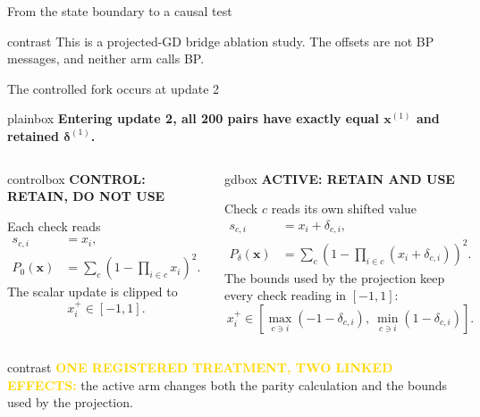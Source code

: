 \documentclass[aspectratio=169,9pt,t]{beamer}
\begin{document}
\begin{frame}{From the state boundary to a causal test}
\vfill
\begin{beamercolorbox}[rounded=true,sep=.55ex]{contrast}
  \centering\fontsize{7}{7.8}\selectfont
  This is a projected-GD bridge ablation study.  The offsets are not BP messages, and neither arm calls BP.
\end{beamercolorbox}
\end{frame}

\begin{frame}{The controlled fork occurs at update 2}
\begin{beamercolorbox}[rounded=true,sep=.62ex]{plainbox}
  \centering\fontsize{7.4}{8.2}\selectfont
  \textbf{Entering update 2, all 200 pairs have exactly equal $\mathbf x^{(1)}$ and retained $\boldsymbol\delta^{(1)}$.}
\end{beamercolorbox}
\vspace{.8mm}

\begin{columns}[T,onlytextwidth]
  \begin{beamercolorbox}[rounded=true,sep=.7ex]{controlbox}
    \fontsize{7.5}{8.3}\selectfont\textcolor{Control}{\bfseries CONTROL: RETAIN, DO NOT USE}\par
    \vspace{1mm}
    Each check reads
    \[
      \begin{aligned}
        s_{c,i}&=x_i,\\
        P_0(\mathbf x)&=\sum_c\left(1-\prod_{i\in c}x_i\right)^2 .
      \end{aligned}
    \]
    The scalar update is clipped to
    \[
      x_i^+\in[-1,1].
    \]
  \end{beamercolorbox}

  \begin{beamercolorbox}[rounded=true,sep=.7ex]{gdbox}
    \fontsize{7.5}{8.3}\selectfont\textcolor{GD}{\bfseries ACTIVE: RETAIN AND USE}\par
    \vspace{1mm}
    Check $c$ reads its own shifted value
    \[
      \begin{aligned}
        s_{c,i}&=x_i+\delta_{c,i},\\
        P_\delta(\mathbf x)&=\sum_c\left(1-\prod_{i\in c}(x_i+\delta_{c,i})\right)^2 .
      \end{aligned}
    \]
    The bounds used by the projection keep every check reading in $[-1,1]$:
    \[
      x_i^+\in\left[\max_{c\ni i}(-1-\delta_{c,i}),\ 
      \min_{c\ni i}(1-\delta_{c,i})\right].
    \]
  \end{beamercolorbox}
\end{columns}

\vfill
\begin{beamercolorbox}[rounded=true,sep=.6ex]{contrast}
  \centering\fontsize{7.1}{7.9}\selectfont
  \textcolor{Gold}{\bfseries ONE REGISTERED TREATMENT, TWO LINKED EFFECTS:}\quad
  the active arm changes both the parity calculation and the bounds used by the projection.
\end{beamercolorbox}
\end{frame}
\end{document}

